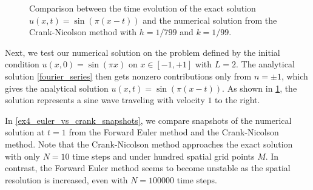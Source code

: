 \begin{figure}[b]
\centering
{}
\caption{\label{sine_evolution}Comparison between the time evolution of the exact solution $u(x,t)=\sin(\pi(x-t))$ and the numerical solution from the Crank-Nicolson method with $h=1/799$ and $k=1/99$.}
\end{figure}

Next, we test our numerical solution on the problem defined by the initial condition $u(x, 0) = \sin(\pi x)$ on $x \in [-1, +1]$ with $L = 2$.
The analytical solution \ref{fourier_series} then gets nonzero contributions only from $n = \pm 1$, which gives the analytical solution $u(x, t) = \sin(\pi(x-t))$.
As shown in \cref{sine_evolution}, the solution represents a sine wave traveling with velocity $1$ to the right.

In \cref{ex4_euler_vs_crank_snapshots}, we compare snapshots of the numerical solution at $t = 1$ from the Forward Euler method and the Crank-Nicolson method.
Note that the Crank-Nicolson method approaches the exact solution with only $N=10$ time steps and under hundred spatial grid points $M$.
In contrast, the Forward Euler method seems to become unstable as the spatial resolution is increased, even with $N=100000$ time steps.

